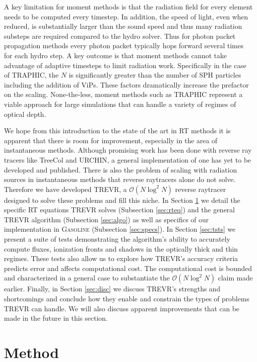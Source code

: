 \documentclass[fleq,usenatbib]{mnras}
\newcommand{\acro}{TREVR}
\newcommand{\bigO}[1]{\mathcal{O}\left(#1\right)}
\begin{document}
A key limitation for moment methods is that the radiation field for every 
element needs to be computed every timestep. In addition, the speed of light, 
even when reduced, is substantially larger than the sound speed and thus many 
radiation substeps are required compared to the hydro solver. Thus for photon 
packet propagation methods every photon packet typically hops forward several 
times for each hydro step. A key outcome is that moment methods cannot take
advantage of adaptive timesteps to limit radiation work. Specifically in the 
case of TRAPHIC, the $N$ is significantly greater than the number of SPH 
particles including the addition of ViPs. These factors dramatically increase 
the prefactor on the scaling.  None-the-less, moment methods such as TRAPHIC 
represent a viable approach for large simulations that can handle a variety 
of regimes of optical depth.

We hope from this introduction to the state of the art in RT methods it is 
apparent that there is room for improvement, especially in the area of 
instantaneous methods. Although promising work has been done with reverse ray 
tracers like TreeCol and URCHIN, a general implementation of one has yet to be 
developed and published. There is also the problem of scaling with radiation 
sources in instantaneous methods that reverse raytracers alone do not solve. 
Therefore we have developed \acro{}, a $\bigO{N \log^2 N}$ reverse raytracer 
designed to solve these problems and fill this niche. In Section 
\ref{sec:mthd} we detail the specific RT equations \acro{} solves 
(Subsection \ref{sec:rteq}) and the general \acro{} algorithm (Subsection 
\ref{sec:algo}) as well as specifics of our implementation in 
\textsc{Gasoline} (Subsection \ref{sec:specs}). In Section \ref{sec:tsts} we 
present a suite of tests demonstrating the algorithm's ability to accurately 
compute fluxes, ionization fronts and shadows in the optically thick and thin 
regimes. These tests also allow us to explore how \acro{}'s accuracy criteria 
predicts error and affects computational cost. The computational cost is 
bounded and characterized in a general case to substantiate the 
$\bigO{N \log^2 N}$ claim made earlier. Finally, in Section \ref{sec:disc} we 
discuss \acro{}'s strengths and shortcomings and conclude how they enable and 
constrain the types of problems \acro{} can handle. We will also discuss 
apparent improvements that can be made in the future in this section.

\section{Method}\label{sec:mthd}
\end{document}
